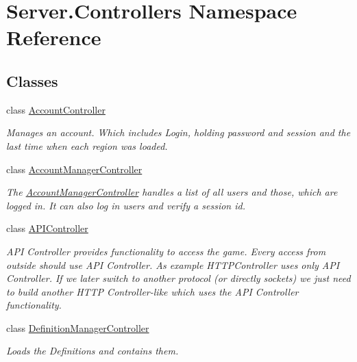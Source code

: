 \hypertarget{namespaceServer_1_1Controllers}{}\section{Server.\+Controllers Namespace Reference}
\label{namespaceServer_1_1Controllers}
\subsection*{Classes}
\begin{DoxyCompactItemize}
\item 
class \hyperlink{classServer_1_1Controllers_1_1AccountController}{Account\+Controller}
\begin{DoxyCompactList}\small\item\em Manages an account. Which includes Login, holding password and session and the last time when each region was loaded. \end{DoxyCompactList}\item 
class \hyperlink{classServer_1_1Controllers_1_1AccountManagerController}{Account\+Manager\+Controller}
\begin{DoxyCompactList}\small\item\em The \hyperlink{classServer_1_1Controllers_1_1AccountManagerController}{Account\+Manager\+Controller} handles a list of all users and those, which are logged in. It can also log in users and verify a session id. \end{DoxyCompactList}\item 
class \hyperlink{classServer_1_1Controllers_1_1APIController}{A\+P\+I\+Controller}
\begin{DoxyCompactList}\small\item\em A\+P\+I Controller provides functionality to access the game. Every access from outside should use A\+P\+I Controller. As example H\+T\+T\+P\+Controller uses only A\+P\+I Controller. If we later switch to another protocol (or directly sockets) we just need to build another H\+T\+T\+P Controller-\/like which uses the A\+P\+I Controller functionality. \end{DoxyCompactList}\item 
class \hyperlink{classServer_1_1Controllers_1_1DefinitionManagerController}{Definition\+Manager\+Controller}
\begin{DoxyCompactList}\small\item\em Loads the Definitions and contains them. \end{DoxyCompactList}\item 

\end{DoxyCompactItemize}
